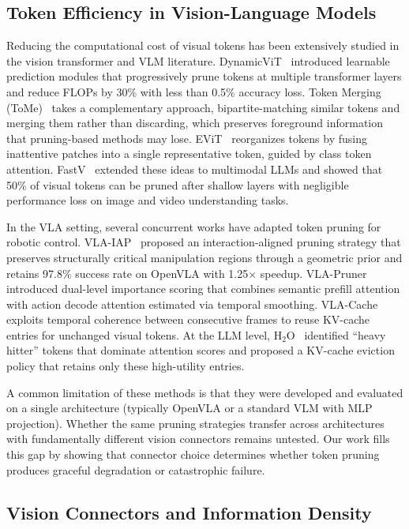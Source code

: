 \subsection{Token Efficiency in Vision-Language Models}

Reducing the computational cost of visual tokens has been extensively studied in the vision transformer and VLM literature. DynamicViT~\cite{rao2021dynamicvit} introduced learnable prediction modules that progressively prune tokens at multiple transformer layers and reduce FLOPs by 30\% with less than 0.5\% accuracy loss. Token Merging (ToMe)~\cite{bolya2023tome} takes a complementary approach, bipartite-matching similar tokens and merging them rather than discarding, which preserves foreground information that pruning-based methods may lose. EViT~\cite{liang2022evit} reorganizes tokens by fusing inattentive patches into a single representative token, guided by class token attention. FastV~\cite{chen2024fastv} extended these ideas to multimodal LLMs and showed that 50\% of visual tokens can be pruned after shallow layers with negligible performance loss on image and video understanding tasks.

In the VLA setting, several concurrent works have adapted token pruning for robotic control. VLA-IAP~\cite{cheng2026vlaiap} proposed an interaction-aligned pruning strategy that preserves structurally critical manipulation regions through a geometric prior and retains 97.8\% success rate on OpenVLA with 1.25$\times$ speedup. VLA-Pruner~\cite{liu2025vlapruner} introduced dual-level importance scoring that combines semantic prefill attention with action decode attention estimated via temporal smoothing. VLA-Cache~\cite{xu2025vlacache} exploits temporal coherence between consecutive frames to reuse KV-cache entries for unchanged visual tokens. At the LLM level, H$_2$O~\cite{zhang2023h2o} identified ``heavy hitter'' tokens that dominate attention scores and proposed a KV-cache eviction policy that retains only these high-utility entries.

A common limitation of these methods is that they were developed and evaluated on a single architecture (typically OpenVLA or a standard VLM with MLP projection). Whether the same pruning strategies transfer across architectures with fundamentally different vision connectors remains untested. Our work fills this gap by showing that connector choice determines whether token pruning produces graceful degradation or catastrophic failure.

\subsection{Vision Connectors and Information Density}

